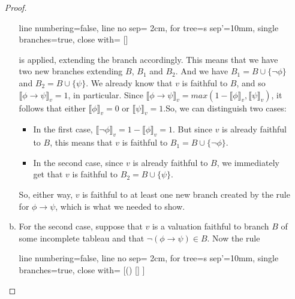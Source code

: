\begin{enumerate}[\thesection.1]
\begin{proof}
\begin{enumerate}[(a)]
					\begin{center}
					\begin{prooftree}
					{
					line numbering=false,
					line no sep= 2cm,
					for tree={s sep'=10mm},
					single branches=true,
					close with=\xmark
					}
					[\phi\to\psi [\neg \phi ] [\psi ] ]
					\end{prooftree}
					\end{center}
					
			is applied, extending the branch accordingly. This means that we have two new branches extending $B$, $B_1$ and $B_2$. And we have $B_1=B\cup\{\neg\phi\}$ and $B_2=B\cup\{\psi\}$. We already know that $v$ is faithful to $B$, and so $\llbracket\phi\to\psi\rrbracket_v=1$, in particular. Since $\llbracket\phi\to\psi\rrbracket_v=max(1-\llbracket\phi\rrbracket_v,\llbracket\psi\rrbracket_v)$, it follows that either $\llbracket\phi\rrbracket_v=0$ or $\llbracket\psi\rrbracket_v=1$.So, we can distinguish two cases:
	\begin{itemize}
		
			\item In the first case, $\llbracket\neg\phi\rrbracket_v=1-\llbracket\phi\rrbracket_v=1$. But since $v$ is already faithful to $B$, this means that $v$ is faithful to $B_1=B\cup\{\neg\phi\}$. 
		
			\item In the second case, since $v$ is already faithful to $B$, we immediately get that $v$ is faithful to $B_2=B\cup\{\psi\}$. 
	
		\end{itemize}
	So, either way, $v$ is faithful to at least one new branch created by the rule for $\phi\to\psi$, which is what we needed to show.
	
	\item For the second case, suppose that $v$ is a valuation faithful to branch $B$ of some incomplete tableau and that $\neg(\phi\to\psi)\in B$. Now the rule 
		\begin{center}{
					\begin{prooftree}
					{
					line numbering=false,
					line no sep= 2cm,
					for tree={s sep'=10mm},
					single branches=true,
					close with=\xmark
					}
					[\neg(\phi\to\psi) [\phi [\neg\psi ] ] ]
					\end{prooftree}}
					\end{center}
					

\end{enumerate}
\end{proof}
\end{enumerate}
